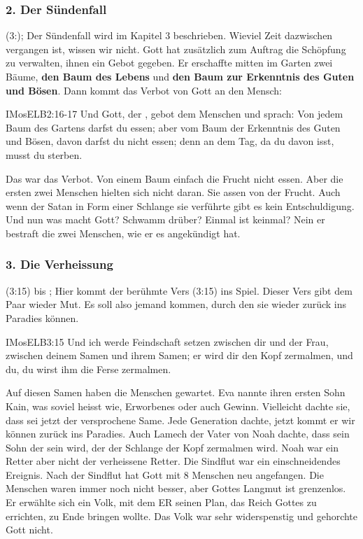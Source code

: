 \documentclass{../../inc/mybib}
\begin{document}
    \subsubsection*{2. Der Sündenfall}
    (3:); Der Sündenfall wird im Kapitel 3 beschrieben. Wieviel Zeit dazwischen vergangen ist, wissen wir nicht. Gott hat zusätzlich zum Auftrag die Schöpfung zu verwalten, ihnen ein Gebot gegeben. Er erschaffte mitten im Garten zwei Bäume, \textbf{den Baum des Lebens} und \textbf{den Baum zur Erkenntnis des Guten und Bösen}. Dann kommt das Verbot von Gott an den Mensch:
    \begin{bibelbox}{IMos}{ELB}{2:16-17}
        Und Gott, der \herr{}, gebot dem Menschen und sprach: \flqq Von jedem Baum des Gartens darfst du essen; aber vom Baum der Erkenntnis des Guten und Bösen, davon darfst du nicht essen; denn an dem Tag, da du davon isst, musst du sterben.\frqq{}
    \end{bibelbox}
    Das war das Verbot. Von einem Baum einfach die Frucht nicht essen. Aber die ersten zwei Menschen hielten sich nicht daran. Sie assen von der Frucht. Auch wenn der Satan in Form einer Schlange sie verführte gibt es kein Entschuldigung. Und nun was macht Gott? Schwamm drüber? Einmal ist keinmal? Nein er bestraft die zwei Menschen, wie er es angekündigt hat. 
    \subsubsection*{3. Die Verheissung}
    (3:15) bis ; Hier kommt der berühmte Vers (3:15) ins Spiel. Dieser Vers gibt dem Paar wieder Mut. Es soll also jemand kommen, durch den sie wieder zurück ins Paradies können.
    \begin{bibelbox}{IMos}{ELB}{3:15}
        Und ich werde Feindschaft setzen zwischen dir und der Frau, zwischen deinem Samen und ihrem Samen; er wird dir den Kopf zermalmen, und du, du wirst ihm die Ferse zermalmen.
    \end{bibelbox}
    Auf diesen Samen haben die Menschen gewartet. Eva nannte ihren ersten Sohn Kain, was soviel heisst wie, Erworbenes oder auch Gewinn. Vielleicht dachte sie, dass sei jetzt der versprochene Same. Jede Generation dachte, jetzt kommt er wir können zurück ins Paradies. Auch Lamech der Vater von Noah dachte, dass sein Sohn der sein wird, der der Schlange der Kopf zermalmen wird. Noah war ein Retter aber nicht der verheissene Retter. Die Sindflut war ein einschneidendes Ereignis. Nach der Sindflut hat Gott mit 8 Menschen neu angefangen. Die Menschen waren immer noch  nicht besser, aber Gottes Langmut ist grenzenlos. Er erwählte sich ein Volk, mit dem ER seinen Plan, das Reich Gottes zu errichten, zu Ende bringen wollte. Das Volk war sehr widerspenstig und gehorchte Gott nicht. 
\end{document}
